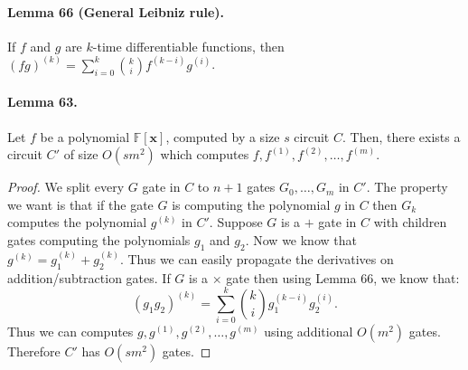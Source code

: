 \paragraph{Lemma 66 (General Leibniz rule).} If $f$ and $g$ are $k$-time differentiable functions, then $(fg)^{(k)}=\sum_{i=0}^k\binom ki f^{(k-i)}g^{(i)}$.
\paragraph{Lemma 63.} Let $f$ be a polynomial $\mathbb F[\mathbf x]$, computed by a size $s$ circuit $C$. Then, there exists a circuit $C'$ of size $O(sm^2)$ which computes $f,f^{(1)},f^{(2)},\ldots,f^{(m)}$.
\begin{proof}We split every $G$ gate in $C$ to $n+1$ gates $G_0,\ldots,G_m$ in $C'$. The property we want is that if the gate $G$ is computing the polynomial $g$ in $C$ then $G_k$ computes the polynomial $g^{(k)}$ in $C'$. Suppose $G$ is a $+$ gate in $C$ with children gates computing the polynomials $g_1$ and $g_2$. Now we know that $g^{(k)}=g_1^{(k)}+g_2^{(k)}$. Thus we can easily propagate the derivatives on addition/subtraction gates. If $G$ is a $\times$ gate then using Lemma 66, we know that:
\[(g_1g_2)^{(k)}=\sum_{i=0}^k\binom ki g_1^{(k-i)}g_2^{(i)}.\]
Thus we can computes $g,g^{(1)},g^{(2)},\ldots,g^{(m)}$ using additional $O(m^2)$ gates. Therefore $C'$ has $O(sm^2)$ gates.\end{proof}
